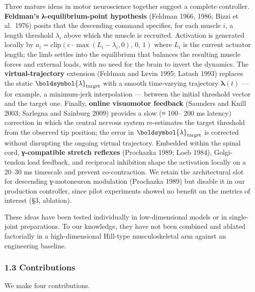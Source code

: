 \documentclass[
  11pt,
]{article}
\begin{document}
Three mature ideas in motor neuroscience together suggest a complete
controller. \textbf{Feldman's λ-equilibrium-point hypothesis} (Feldman
1966, 1986; Bizzi et al.~1976) posits that the descending command
specifies, for each muscle \(i\), a length threshold \(\lambda_i\) above
which the muscle is recruited. Activation is generated locally by
\(a_i = \mathrm{clip}(c\cdot\max(L_i - \lambda_i, 0),\,0,\,1)\) where
\(L_i\) is the current actuator length; the limb settles into the
equilibrium that balances the resulting muscle forces and external
loads, with no need for the brain to invert the dynamics. The
\textbf{virtual-trajectory} extension (Feldman and Levin 1995; Latash
1993) replaces the static \(\boldsymbol{\lambda}_{\rm target}\) with a
smooth time-varying trajectory \(\boldsymbol{\lambda}(t)\) --- for
example, a minimum-jerk interpolation --- between the initial threshold
vector and the target one. Finally, \textbf{online visuomotor feedback}
(Saunders and Knill 2003; Sarlegna and Sainburg 2009) provides a slow (≈
100-- 200 ms latency) correction in which the central nervous system
re-estimates the target threshold from the observed tip position; the
error in \(\boldsymbol{\lambda}_{\rm target}\) is corrected without
disrupting the ongoing virtual trajectory. Embedded within the spinal
cord, \textbf{γ-compatible stretch reflexes} (Prochazka 1989; Loeb
1984), Golgi-tendon load feedback, and reciprocal inhibition shape the
activation locally on a 20--30 ms timescale and prevent co-contraction.
We retain the architectural slot for descending γ-motoneuron modulation
(Prochazka 1989) but disable it in our production controller, since
pilot experiments showed no benefit on the metrics of interest (§3,
ablation).

These ideas have been tested individually in low-dimensional models or
in single-joint preparations. To our knowledge, they have not been
combined and ablated factorially in a high-dimensional Hill-type
musculoskeletal arm against an engineering baseline.

\hypertarget{contributions}{%
\subsubsection{1.3 Contributions}\label{contributions}}

We make four contributions.
\end{document}
